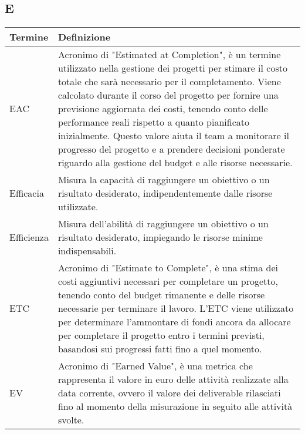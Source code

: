 \documentclass[10pt]{article}
\begin{document}
\subsection{E} %
\begin{longtable}{|>{\centering\arraybackslash}m{2.5cm}|>{\arraybackslash}m{12.5cm}|}
\hline
\rowcolor[gray]{0.8}
\textbf{Termine} & \textbf{Definizione}\\
\endhead
\hline
EAC & Acronimo di "Estimated at Completion", è un termine utilizzato nella gestione dei progetti per stimare il costo totale che sarà necessario per il completamento. Viene calcolato durante il corso del progetto per fornire una previsione aggiornata dei costi, tenendo conto delle performance reali rispetto a quanto pianificato inizialmente. Questo valore aiuta il team a monitorare il progresso del progetto e a prendere decisioni ponderate riguardo alla gestione del budget e alle risorse necessarie.\\
\hline
Efficacia & Misura la capacità di raggiungere un obiettivo o un risultato desiderato, indipendentemente dalle risorse utilizzate.\\
\hline
Efficienza & Misura dell'abilità di raggiungere un obiettivo o un risultato desiderato, impiegando le risorse minime indispensabili.\\
\hline
ETC & Acronimo di "Estimate to Complete", è una stima dei costi aggiuntivi necessari per completare un progetto, tenendo conto del budget rimanente e delle risorse necessarie per terminare il lavoro. L'ETC viene utilizzato per determinare l'ammontare di fondi ancora da allocare per completare il progetto entro i termini previsti, basandosi sui progressi fatti fino a quel momento.\\
\hline
EV & Acronimo di "Earned Value", è una metrica che rappresenta il valore in euro delle attività realizzate alla data corrente, ovvero il valore dei deliverable rilasciati fino al momento della misurazione in seguito alle attività svolte.\\
\hline
\end{longtable}
\end{document}
